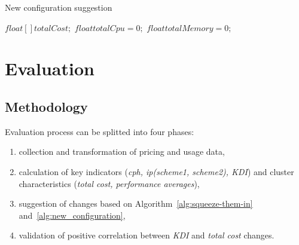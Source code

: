 \documentclass[]{final_report}
\begin{document}
\begin{algorithm}[h]
\caption{New configuration suggestion}
\label{alg:new_configuration}
 \algrenewcommand{}
 \algrenewcommand{}

  $float[ ] totalCost;$
  $float totalCpu = 0;$
  $float totalMemory = 0;$




\end{algorithm}




\chapter{Evaluation}

\section{Methodology}

Evaluation process can be splitted into four phases:
\begin{enumerate}
\item collection and transformation of pricing and usage data,
\item calculation of key indicators (\textit{cph, ip(scheme1, scheme2), KDI}) and cluster characteristics (\textit{total cost, performance averages}), 
\item suggestion of changes based on Algorithm~\ref{alg:squeeze-them-in} and~\ref{alg:new_configuration},
\item validation of positive correlation between \textit{KDI} and \textit{total cost} changes.
\end{enumerate}
\end{document}
